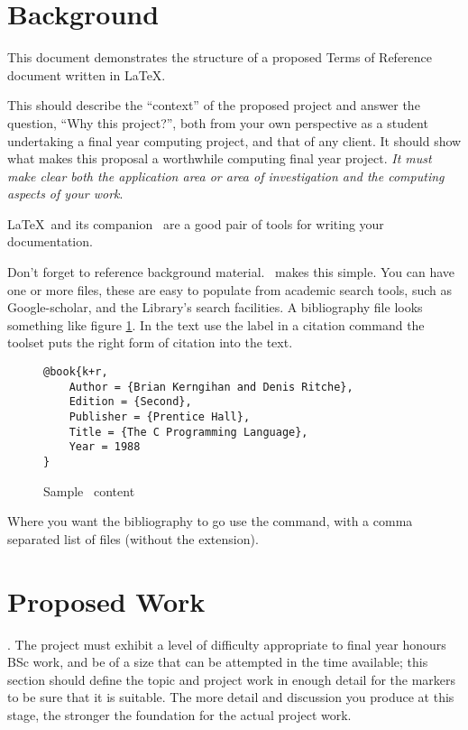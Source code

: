 
\section{Background}
This document demonstrates the structure of a proposed Terms of Reference document written in \LaTeX.

This should describe the ``context'' of the proposed project and answer the question, ``Why this project?'', both from your own perspective as a student undertaking a final year computing project, and that of any client.  It should show what makes this proposal a worthwhile computing final year project.  \emph{It must make clear both the application area or area of investigation and the computing aspects of your work}.

\LaTeX\ and its companion \BibTeX\ are a good pair of tools for writing your documentation.

Don't forget to reference background material.  \BibTeX\ makes this simple.
You can have one or more  files, these are  easy to populate from academic search tools, such as Google-scholar, and the Library's search facilities.  A bibliography file looks something like figure \ref{bibtex-sample}.  In the text use the label in a citation command
	\texttt{\citep{k+r}} the toolset puts the right form of citation
	\citep[pages 2--4]{k+r} into the text.


\begin{figure}
\begin{tcolorbox}
\begin{verbatim}
@book{k+r,
	Author = {Brian Kerngihan and Denis Ritche},
	Edition = {Second},
	Publisher = {Prentice Hall},
	Title = {The C Programming Language},
	Year = 1988
}
\end{verbatim}
\end{tcolorbox}
\caption{Sample \BibTeX\ content}
\label{bibtex-sample}
\end{figure}

Where you want the bibliography to go use the \texttt{} command, with a comma separated list of  files (without the extension).

\section{Proposed Work}
\label{proposed}
.  The project must exhibit a level of difficulty appropriate to final year honours BSc work, and be of a size that can be attempted in the time available; this section should define the topic and project work in enough detail for the markers to be sure that it is suitable. The more detail and discussion you produce at this stage, the stronger the foundation for the actual project work.

